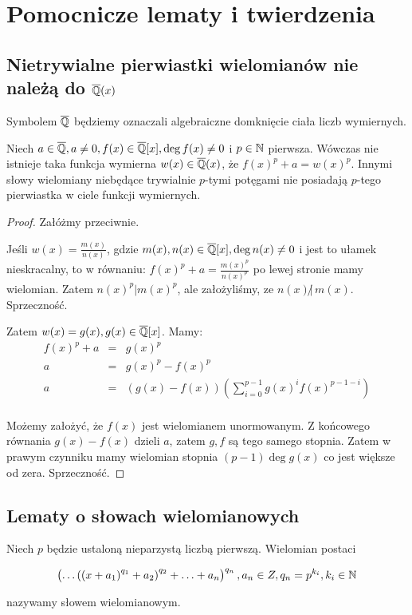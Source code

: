 \chapter{Pomocnicze lematy i twierdzenia}
\label{ch:auxiliary}
\section{Nietrywialne pierwiastki wielomianów nie należą do $\overline{\mathbb{Q}}(x)$}
Symbolem $\overline{\mathbb{Q}}$ będziemy oznaczali algebraiczne domknięcie ciała liczb
wymiernych.
\begin{lemma}
  Niech $a \in \overline{\mathbb{Q}}, a \neq 0, f(x) \in \overline{\mathbb{Q}}[x], \deg f(x)
  \neq 0$ i $p \in \mathbb{N}$ pierwsza.
  Wówczas nie istnieje taka funkcja wymierna $w(x) \in \overline{\mathbb{Q}}(x)$, że
  $f(x)^{p} + a = w(x)^p$.
  Innymi słowy wielomiany niebędące trywialnie $p$-tymi potęgami nie posiadają
  $p$-tego pierwiastka w ciele funkcji wymiernych.
  \label{lem:nontrivial_roots}
\end{lemma}

\begin{proof}
Załóżmy przeciwnie.

Jeśli $w(x) = \frac{m(x)}{n(x)}$, gdzie $m(x), n(x) \in \overline{\mathbb{Q}}[x], \deg
n(x) \neq 0$ i jest to ułamek nieskracalny, to w równaniu: $f(x)^{p} + a =
\frac{m(x)^p}{n(x)^p}$ po lewej stronie mamy wielomian. Zatem $n(x)^p | m(x)^p$,
ale założyliśmy, ze $n(x) \! \! \not| \, m(x)$. Sprzeczność.

Zatem $w(x) = g(x), g(x) \in \overline{\mathbb{Q}}[x]$. Mamy:
\begin{eqnarray*}
  f(x)^p + a &=& g(x)^p \\
  a &=& g(x)^p - f(x)^p\\
  a &=& \left(g(x) - f(x)\right)\left(\sum_{i=0}^{p-1}g(x)^if(x)^{p-1 -
  i}\right)\\
\end{eqnarray*}

Możemy założyć, że $f(x)$ jest wielomianem unormowanym.
Z końcowego równania $g(x) - f(x)$ dzieli $a$, zatem $g, f$ są tego samego
stopnia.
Zatem w prawym czynniku mamy wielomian stopnia $(p-1)\deg g(x)$ co jest większe
od zera.
Sprzeczność.
\end{proof}

\section{Lematy o słowach wielomianowych}
\begin{defin}
  Niech $p$ będzie ustaloną nieparzystą liczbą pierwszą. Wielomian postaci

  \begin{equation}
    \left( \ldots \left(\left(x + a_1\right)^{q_1} + a_2\right)^{q_2} +
      \ldots + a_n\right)^{q_n}, a_n \in Z, q_n = p^{k_i}, k_i \in \mathbb{N}
  \label{eq:polynomial_word_extended}
  \end{equation}

  nazywamy słowem wielomianowym.
\end{defin}

